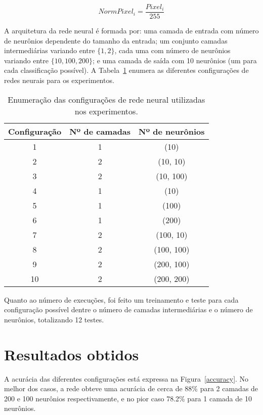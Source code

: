 \documentclass[twocolumn]{article}
\newcommand{\hiddenlayers}{1, 2}
\newcommand{\hiddenneurons}{10, 100, 200}
\begin{document}
    \begin{equation}
        \label{norm-pixel}
        NormPixel_i = \frac{Pixel_i}{255}
    \end{equation}

    A arquitetura da rede neural é formada por: uma camada de entrada com
    número de neurônios dependente do tamanho da entrada; um conjunto camadas
    intermediárias variando entre $\{\hiddenlayers{}\}$, cada uma com número de
    neurônios variando entre $\{\hiddenneurons{}\}$; e uma camada de saída com
    10 neurônios (um para cada classificação possível). A Tabela~\ref{configs}
    enumera as diferentes configurações de redes neurais para os experimentos.

    \begin{table}
        \begin{tabular}{c c c}
            \toprule
            Configuração & Nº de camadas & Nº de neurônios \\
            \midrule
            1  & 1 & (10) \\
            2  & 2 & (10, 10) \\
            3  & 2 & (10, 100) \\
            4  & 1 & (10) \\
            5  & 1 & (100) \\
            6  & 1 & (200) \\
            7  & 2 & (100, 10) \\
            8  & 2 & (100, 100) \\
            9  & 2 & (200, 100) \\
            10 & 2 & (200, 200) \\
            \bottomrule
        \end{tabular}
        \caption{%
            Enumeração das configurações de rede neural utilizadas nos
            experimentos.\label{configs}
        }
    \end{table}

    Quanto ao número de execuções, foi feito um treinamento e teste para cada
    configuração possível dentre o número de camadas intermediárias e o número
    de neurônios, totalizando 12 testes.

    \section{Resultados obtidos}

    A acurácia das diferentes configurações está expressa na
    Figura~\ref{accuracy}. No melhor dos casos, a rede obteve uma acurácia de
    cerca de 88\% para 2 camadas de 200 e 100 neurônios respectivamente, e no
    pior caso 78.2\% para 1 camada de 10 neurônios.
\end{document}
